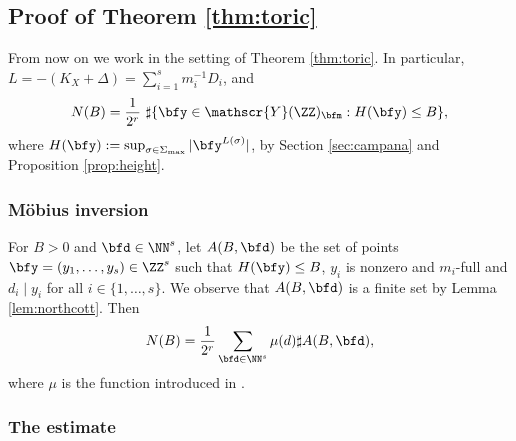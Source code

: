 \subsection{Proof of Theorem \ref{thm:toric}}
\label{sec:proof_thmtoric}

From now on we work in the setting of Theorem \ref{thm:toric}.
In particular, $L=-(K_X+\Delta)=\sum_{i=1}^s m_i^{-1}D_i$, and
\[
N(B)=\frac 1{2^r}\ \sharp
\{\bfy\in\mathscr{Y}(\ZZ)_{\bfm}: H(\bfy)\leq B\},
\]
where
$H(\bfy):=\sup_{\sigma\in\Sigma_{\max}} | \bfy^{L(\sigma)}|$,
by Section \ref{sec:campana} and Proposition \ref{prop:height}.

\subsubsection{Möbius inversion}

For $B>0$ and $\bfd\in\NN^{s}$,
let $A(B,\bfd)$ be the set of points
$\bfy=(y_1,\dots,y_s)\in\ZZ^{s}$ such that
$H(\bfy)\leq B$, $y_i$ is nonzero and $m_i$-full and $d_i\mid y_i$ for all $i\in\{1,\dots,s\}$.
We observe that $A(B, \bfd)$ is a finite set by Lemma \ref{lem:northcott}.
Then
\begin{equation}
\label{eq:moebius_inversion}
N(B)=\frac 1{2^r}\sum_{\bfd\in\NN^{s}}\mu(d)\sharp A(B, \bfd),
\end{equation}
where $\mu$ is the function introduced in \cite[Def.\,\& Prop.\,11.9]{MR1679841}.

\subsubsection{The estimate}

